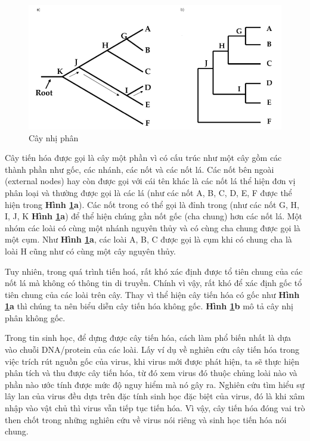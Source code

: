 \documentclass[12pt]{report}
\begin{document}
\begin{figure}[h]
	\centering
	\includegraphics[scale=0.5]{Image/1.0.png}
	\caption{Cây nhị phân \cite{cia-2}}
	\label{fig:image1.1}
\end{figure}

Cây tiến hóa \cite{cia-2} được gọi là cây một phần vì có cấu trúc như một cây gồm các thành phần như gốc, các nhánh, các nốt và các nốt lá. Các nốt bên ngoài (external nodes) hay còn được gọi với cái tên khác là các nốt lá thể hiện đơn vị phân loại và thường được gọi là các lá (như các nốt A, B, C, D, E, F được thể hiện trong \textbf{Hình \ref{fig:image1.1}a}). Các nốt trong có thể gọi là đỉnh trong (như các nốt G, H, I, J, K  \textbf{Hình \ref{fig:image1.1}a}) để thể hiện chúng gần nốt gốc (cha chung) hơn các nốt lá. Một nhóm các loài có cùng một nhánh nguyên thủy và có cùng cha chung được gọi là một cụm. Như \textbf{Hình \ref{fig:image1.1}a}, các loài A, B, C được gọi là cụm khi có chung cha là loài H cũng như có cùng một cây nguyên thủy. 

 Tuy nhiên, trong quá trình tiến hoá, rất khó xác định được tổ tiên chung của các nốt lá mà không có thông tin di truyền. Chính vì vậy, rất khó để xác định gốc tổ tiên chung của các loài trên cây. Thay vì thể hiện cây tiến hóa có gốc  như \textbf{Hình \ref{fig:image1.1}a} thì chúng ta nên biểu diễn cây tiến hóa không gốc. \textbf{Hình \ref{fig:image1.1}b} mô tả cây nhị phân không gốc.

Trong tin sinh học, để dựng được cây tiến hóa, cách làm phổ biến nhất là dựa vào chuỗi DNA/protein của các loài. Lấy ví dụ về nghiên cứu cây tiến hóa trong việc trích rút nguồn gốc của virus, khi virus mới được phát hiện, ta sẽ thực hiện phân tích và thu được cây tiến hóa, từ đó xem virus đó thuộc chủng loài nào và phần nào ước tính được mức độ nguy hiểm mà nó gây ra. Nghiên cứu tìm hiểu sự lây lan của virus đều dựa trên đặc tính sinh học đặc biệt của virus, đó là khi xâm nhập vào vật chủ thì virus vẫn tiếp tục tiến hóa. Vì vậy, cây tiến hóa đóng vai trò then chốt trong những nghiên cứu về virus nói riêng và sinh học tiến hóa nói chung. 
\end{document}
